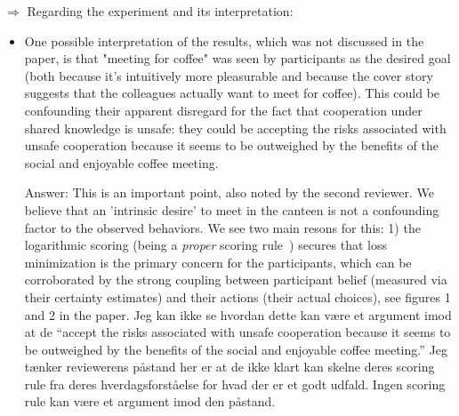 \documentclass[a4paper]{article}
\newenvironment{robin}{\smallskip \noindent \color{red!10!green!50!blue}}{\color{black}\smallskip}
\newenvironment{tobo}{\smallskip \noindent \color{yellow!80!black!80}}{\color{black}\smallskip}
\begin{document}
$\Rightarrow$ Regarding the experiment and its interpretation:
\begin{itemize}
  \item One possible interpretation of the results, which was not discussed in the paper, is that "meeting for coffee" was seen by participants as the desired goal (both because it's intuitively more pleasurable and because the cover story suggests that the colleagues actually want to meet for coffee). This could be confounding their apparent disregard for the fact that cooperation under shared knowledge is unsafe: they could be accepting the risks associated with unsafe cooperation because it seems to be outweighed by the benefits of the social and enjoyable coffee meeting. 

\begin{robin}Answer: This is an important point, also noted by the second reviewer. We believe that an 'intrinsic desire' to meet in the canteen is not a confounding factor to the observed behaviors. We see two main resons for this: 1) the logarithmic scoring (being a \emph{proper} scoring rule~\cite{seidenfeld1985calibration, palfrey2009eliciting}) secures that loss minimization is the primary concern for the participants, which can be corroborated by the strong coupling between participant belief (measured via their certainty estimates) and their actions (their actual choices), see figures 1 and 2 in the paper. 
\begin{tobo}
Jeg kan ikke se hvordan dette kan være et argument imod at de ``accept the risks associated with unsafe cooperation because it seems to be outweighed by the benefits of the social and enjoyable coffee meeting.'' Jeg tænker reviewerens påstand her er at de ikke klart kan skelne deres scoring rule fra deres hverdagsforståelse for hvad der er et godt udfald. Ingen scoring rule kan være et argument imod den påstand.  
\end{tobo}

\end{robin}
\end{itemize}
\end{document}
